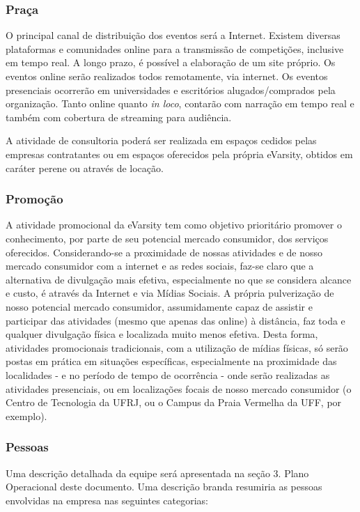 \documentclass[a4paper, 12pt]{paper}
\begin{document}
\subsubsection{Praça}
O principal canal de distribuição dos eventos será a Internet. Existem diversas plataformas e comunidades online para a transmissão de competições, inclusive em tempo real. A longo prazo, é possível a elaboração de um site próprio. Os eventos online serão realizados todos remotamente, via internet. Os eventos presenciais ocorrerão em universidades e escritórios alugados/comprados pela organização. Tanto online quanto \textit{in loco}, contarão com narração em tempo real e também com cobertura de streaming para audiência.

A atividade de consultoria poderá ser realizada em espaços cedidos pelas empresas contratantes ou em espaços oferecidos pela própria eVarsity, obtidos em caráter perene ou através de locação.
\subsubsection{Promoção}
A atividade promocional da eVarsity tem como objetivo prioritário promover o conhecimento, por parte de seu potencial mercado consumidor, dos serviços oferecidos. Considerando-se a proximidade de nossas atividades e de nosso mercado consumidor com a internet e as redes sociais, faz-se claro que a alternativa de divulgação mais efetiva, especialmente no que se considera alcance e custo, é através da Internet e via Mídias Sociais. A própria pulverização de nosso potencial mercado consumidor, assumidamente capaz de assistir e participar das atividades (mesmo que apenas das online) à distância, faz toda e qualquer divulgação física e localizada muito menos efetiva. Desta forma, atividades promocionais tradicionais, com a utilização de mídias físicas, só serão postas em prática em situações específicas, especialmente na proximidade das localidades - e no período de tempo de ocorrência - onde serão realizadas as atividades presenciais, ou em localizações focais de nosso mercado consumidor (o Centro de Tecnologia da UFRJ, ou o Campus da Praia Vermelha da UFF, por exemplo). 
\subsubsection{Pessoas}
Uma descrição detalhada da equipe será apresentada na seção 3. Plano Operacional deste documento. Uma descrição branda resumiria as pessoas envolvidas na empresa nas seguintes categorias: 
\end{document}
